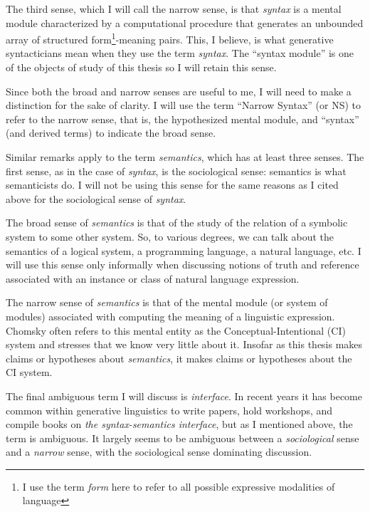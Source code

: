 \documentclass[MilwayThesis]{subfiles}
\begin{document}
The third sense, which I will call the narrow sense, is that \textit{syntax} is a mental module characterized by a computational procedure that generates an unbounded array of structured form\footnote{I use the term \textit{form} here to refer to all possible expressive modalities of language}-meaning pairs.
This, I believe, is what generative syntacticians mean when they use the term \textit{syntax}.
The ``syntax module'' is one of the objects of study of this thesis so I will retain this sense.

Since both the broad and narrow senses are useful to me, I will need to make a distinction for the sake of clarity.
I will use the term ``Narrow Syntax'' (or NS) to refer to the narrow sense, that is, the hypothesized mental module, and ``syntax'' (and derived terms) to indicate the broad sense.

Similar remarks apply to the term \textit{semantics}, which has at least three senses.
The first sense, as in the case of \textit{syntax}, is the sociological sense: semantics is what semanticists do.
I will not be using this sense for the same reasons as I cited above for the sociological sense of \textit{syntax}.

The broad sense of \textit{semantics} is that of the study of the relation of a symbolic system to some other system.
So, to various degrees, we can talk about the semantics of a logical system, a programming language, a natural language, etc.
I will use this sense only informally when discussing notions of truth and reference associated with an instance or class of natural language expression.

The narrow sense of \textit{semantics} is that of the mental module (or system of modules) associated with computing the meaning of a linguistic expression.
Chomsky often refers to this mental entity as the Conceptual-Intentional (CI) system and stresses that we know very little about it.
Insofar as this thesis makes claims or hypotheses about \textit{semantics}, it makes claims or hypotheses about the CI system.

The final ambiguous term I will discuss is \textit{interface}.
In recent years it has become common within generative linguistics to write papers, hold workshops, and compile books on \textit{the syntax-semantics interface}, but as I mentioned above, the term is ambiguous.
It largely seems to be ambiguous between a \textit{sociological} sense and a \textit{narrow} sense, with the sociological sense dominating discussion.
\end{document}

